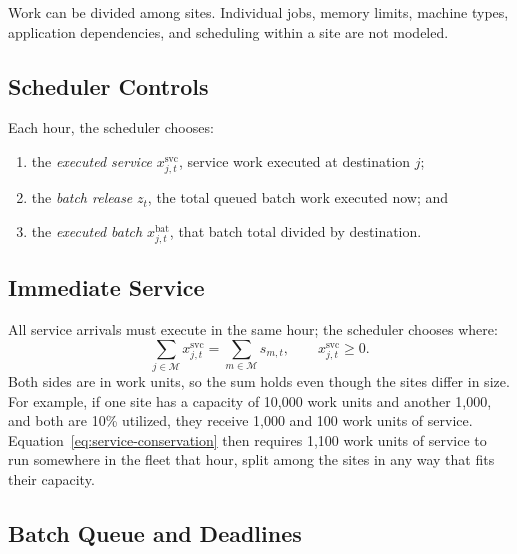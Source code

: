 \documentclass{UNCC-thesis}
\begin{document}
Work can be divided among sites. Individual jobs, memory limits, machine
types, application dependencies, and scheduling within a site are not
modeled. 

\subsection{Scheduler Controls}
\label{subsec:problem-decisions}

Each hour, the scheduler chooses:
\begin{enumerate}
  \item the \emph{executed service} \(x^{\mathrm{svc}}_{j,t}\), service work
        executed at destination \(j\);
  \item the \emph{batch release} \(z_t\), the total queued batch work
        executed now; and
  \item the \emph{executed batch} \(x^{\mathrm{bat}}_{j,t}\), that batch
        total divided by destination.
\end{enumerate}

\subsection{Immediate Service}
\label{subsec:problem-service}

All service arrivals must execute in the same hour; the scheduler chooses
where:
\begin{equation}
  \sum_{j\in\mathcal M}x^{\mathrm{svc}}_{j,t}
  =
  \sum_{m\in\mathcal M}s_{m,t},
  \qquad
  x^{\mathrm{svc}}_{j,t}\geq0.
  \label{eq:service-conservation}
\end{equation}
Both sides are in work units, so the sum holds even though the sites differ
in size. For example, if one site has a capacity of 10,000 work units and
another 1,000, and both are 10\% utilized, they receive 1,000 and 100 work
units of service. Equation~\eqref{eq:service-conservation} then requires
1,100 work units of service to run somewhere in the fleet that hour, split
among the sites in any way that fits their capacity.


\subsection{Batch Queue and Deadlines}
\label{subsec:problem-batch}
\end{document}
